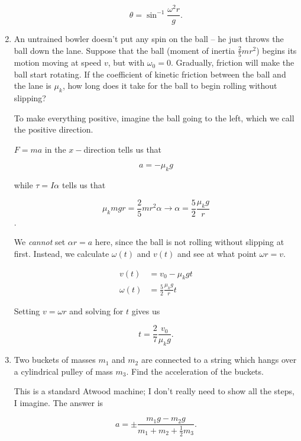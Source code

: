 \documentclass[12pt]{article}
\begin{document}
\begin{enumerate}
$$\theta = \sin^{-1} \frac{\omega^2 r}{g}.$$

\color{Black}

\item An untrained bowler doesn't put any spin on the ball -- he just throws the ball down the lane. Suppose that the ball (moment of inertia $\frac{2}{5}mr^2$)
begins its motion moving at speed $v$, but with $\omega_0 = 0$. Gradually, friction will make the ball start rotating.
If the coefficient of kinetic friction between the ball and the lane is $\mu_k$, how long does it take
for the ball to begin rolling without slipping?

\color{Red}

To make everything positive, imagine the ball going to the left, which we call the positive direction.

$F=ma$ in the $x-$direction tells us that

$$a = -\mu_k g$$

while $\tau = I \alpha$ tells us that

$$\mu_k mgr = \frac{2}{5}mr^2\alpha \rightarrow \alpha = \frac{5}{2} \frac{\mu_k g}{r}$$.

We {\it cannot} set $\alpha r = a$ here, since the ball is not rolling without slipping at first. Instead,
we calculate $\omega(t)$ and $v(t)$ and see at what point $\omega r = v$.

\begin{align}
v(t) &= v_0 - \mu_k gt\\
\omega(t) &= \frac{5}{2} \frac{\mu_k g}{r} t
\end{align}

Setting $v=\omega r$ and solving for $t$ gives us

$$t = \frac{2}{7} \frac{v_0}{\mu_k g}.$$

\color{Black}

\item Two buckets of masses $m_1$ and $m_2$ are connected to a string which hangs over a cylindrical pulley of mass $m_3$. Find the acceleration of the buckets.

\color{Red}

This is a standard Atwood machine; I don't really need to show all the steps, I imagine. The answer is

$$a = \pm \frac{m_1 g - m_2 g}{m_1 + m_2 + \frac{1}{2}m_3}.$$

\color{Black}



\end{enumerate}
\end{document}
